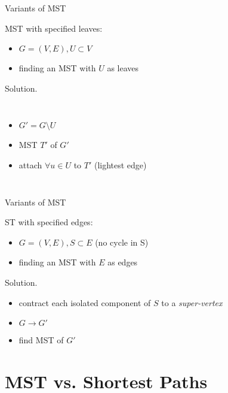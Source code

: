 \begin{frame}{Variants of MST}
  \begin{exampleblock}{MST with specified leaves: }
    \begin{itemize}
      \item $G = (V, E), U \subset V$
      \item finding an MST with $U$ as leaves
    \end{itemize}
  \end{exampleblock}

  \begin{block}{Solution.}
    \begin{columns}
	\begin{itemize}
	  \item $G' = G \setminus U$
	  \item MST $T'$ of $G'$
	  \item attach $\forall u \in U$ to $T'$ (lightest edge)
	\end{itemize}
    \end{columns}
  \end{block}
\end{frame}
\begin{frame}{Variants of MST}
  \begin{block}{ST with specified edges: }
    \begin{itemize}
      \item $G = (V,E), S \subset E$ (no cycle in S)
      \item finding an MST with $E$ as edges
    \end{itemize}
  \end{block}

  \begin{block}{Solution.}
    \begin{itemize}
      \item contract each isolated component of $S$ to a \emph{super-vertex}
      \item $G \to G'$
      \item find MST of $G'$
    \end{itemize}
  \end{block}
\end{frame}
\section{MST vs. Shortest Paths}


